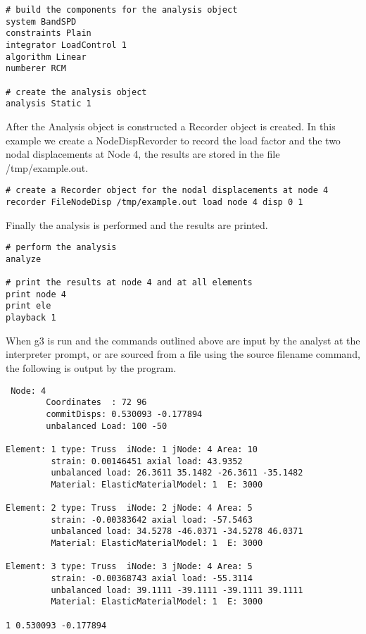 \documentclass[12pt]{article}
\begin{document}
{\sf\small \begin{verbatim}
# build the components for the analysis object
system BandSPD
constraints Plain
integrator LoadControl 1
algorithm Linear
numberer RCM

# create the analysis object 
analysis Static 1
\end{verbatim} }

After the Analysis object is constructed a Recorder object is
created. In this example we create a NodeDispRevorder to record the
load factor and the two nodal displacements at Node 4, the results are
stored in the file {\sf /tmp/example.out}.

{\sf\small \begin{verbatim}
# create a Recorder object for the nodal displacements at node 4
recorder FileNodeDisp /tmp/example.out load node 4 disp 0 1
\end{verbatim} }

Finally the analysis is performed and the results are printed. 

{\sf\small \begin{verbatim}
# perform the analysis
analyze

# print the results at node 4 and at all elements
print node 4
print ele
playback 1
\end{verbatim} }

When g3 is run and the commands outlined above are input by the analyst at the
interpreter prompt, or are sourced from a file using the {\sf source
filename} command, the following is output by the program. 

{\sf\small
\begin{verbatim}
 Node: 4
        Coordinates  : 72 96 
        commitDisps: 0.530093 -0.177894 
        unbalanced Load: 100 -50 

Element: 1 type: Truss  iNode: 1 jNode: 4 Area: 10 
         strain: 0.00146451 axial load: 43.9352 
         unbalanced load: 26.3611 35.1482 -26.3611 -35.1482 
         Material: ElasticMaterialModel: 1  E: 3000

Element: 2 type: Truss  iNode: 2 jNode: 4 Area: 5 
         strain: -0.00383642 axial load: -57.5463 
         unbalanced load: 34.5278 -46.0371 -34.5278 46.0371 
         Material: ElasticMaterialModel: 1  E: 3000

Element: 3 type: Truss  iNode: 3 jNode: 4 Area: 5 
         strain: -0.00368743 axial load: -55.3114 
         unbalanced load: 39.1111 -39.1111 -39.1111 39.1111 
         Material: ElasticMaterialModel: 1  E: 3000

1 0.530093 -0.177894
\end{verbatim}
}
\end{document}

